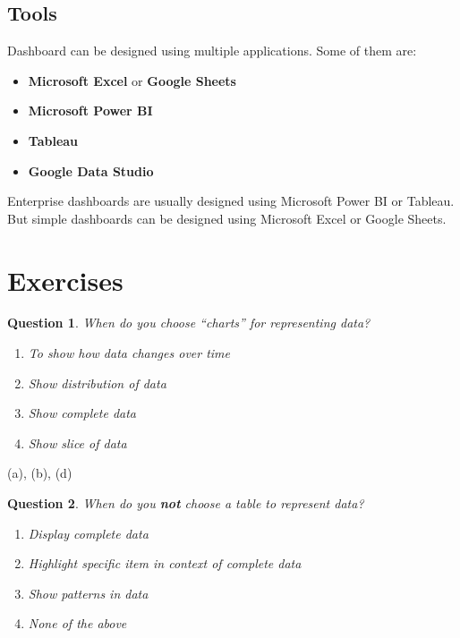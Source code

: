 \documentclass[11pt,fleqn]{book} %
\newtheorem{question}{Question}
\begin{document}
\begin{example}
\subsection{Tools}

Dashboard can be designed using multiple applications. Some of them are:

\begin{itemize}
  \item \textbf{Microsoft Excel} or \textbf{Google Sheets}
  \item \textbf{Microsoft Power BI}
  \item \textbf{Tableau}
  \item \textbf{Google Data Studio}
\end{itemize}
Enterprise dashboards are usually designed using Microsoft Power BI or Tableau.
But simple dashboards can be designed using Microsoft Excel or Google Sheets.

\newpage

\section{Exercises}

\begin{question}
When do you choose “charts” for representing data?
  \begin{enumerate}[label=(\alph*)]
    \item To show how data changes over time
    \item Show distribution of data
    \item Show complete data
    \item Show slice of data
\end{enumerate}
\end{question}

\begin{rotanswer}
  (a), (b), (d)
\end{rotanswer}

\begin{question}
  When do you \textbf{not} choose a table to represent data?
  \begin{enumerate}[label=(\alph*)]
    \item Display complete data
    \item Highlight specific item in context of complete data
    \item Show patterns in data
    \item None of the above
\end{enumerate}
\end{question}


\end{example}
\end{document}
